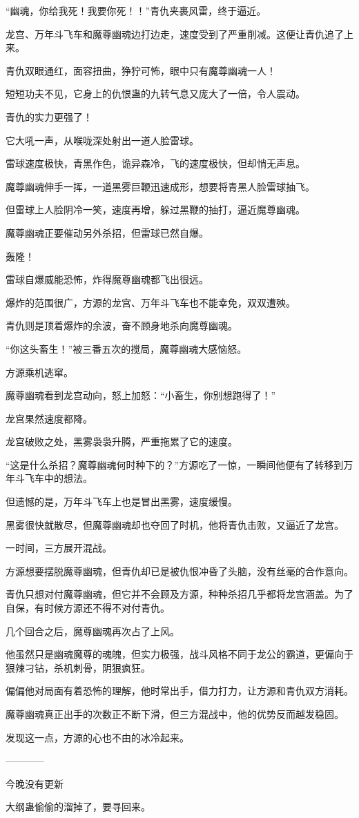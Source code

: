 \begin{this_body}
“幽魂，你给我死！我要你死！！”青仇夹裹风雷，终于逼近。

龙宫、万年斗飞车和魔尊幽魂边打边走，速度受到了严重削减。这便让青仇追了上来。

青仇双眼通红，面容扭曲，狰狞可怖，眼中只有魔尊幽魂一人！

短短功夫不见，它身上的仇恨蛊的九转气息又庞大了一倍，令人震动。

青仇的实力更强了！

它大吼一声，从喉咙深处射出一道人脸雷球。

雷球速度极快，青黑作色，诡异森冷，飞的速度极快，但却悄无声息。

魔尊幽魂伸手一挥，一道黑雾巨鞭迅速成形，想要将青黑人脸雷球抽飞。

但雷球上人脸阴冷一笑，速度再增，躲过黑鞭的抽打，逼近魔尊幽魂。

魔尊幽魂正要催动另外杀招，但雷球已然自爆。

轰隆！

雷球自爆威能恐怖，炸得魔尊幽魂都飞出很远。

爆炸的范围很广，方源的龙宫、万年斗飞车也不能幸免，双双遭殃。

青仇则是顶着爆炸的余波，奋不顾身地杀向魔尊幽魂。

“你这头畜生！”被三番五次的搅局，魔尊幽魂大感恼怒。

方源乘机逃窜。

魔尊幽魂看到龙宫动向，怒上加怒：“小畜生，你别想跑得了！”

龙宫果然速度都降。

龙宫破败之处，黑雾袅袅升腾，严重拖累了它的速度。

“这是什么杀招？魔尊幽魂何时种下的？”方源吃了一惊，一瞬间他便有了转移到万年斗飞车中的想法。

但遗憾的是，万年斗飞车上也是冒出黑雾，速度缓慢。

黑雾很快就散尽，但魔尊幽魂却也夺回了时机，他将青仇击败，又逼近了龙宫。

一时间，三方展开混战。

方源想要摆脱魔尊幽魂，但青仇却已是被仇恨冲昏了头脑，没有丝毫的合作意向。

青仇只想对付魔尊幽魂，但它并不会顾及方源，种种杀招几乎都将龙宫涵盖。为了自保，有时候方源还不得不对付青仇。

几个回合之后，魔尊幽魂再次占了上风。

他虽然只是幽魂魔尊的魂魄，但实力极强，战斗风格不同于龙公的霸道，更偏向于狠辣刁钻，杀机刺骨，阴狠疯狂。

偏偏他对局面有着恐怖的理解，他时常出手，借力打力，让方源和青仇双方消耗。

魔尊幽魂真正出手的次数正不断下滑，但三方混战中，他的优势反而越发稳固。

发现这一点，方源的心也不由的冰冷起来。

------------

今晚没有更新

大纲蛊偷偷的溜掉了，要寻回来。

\end{this_body}

